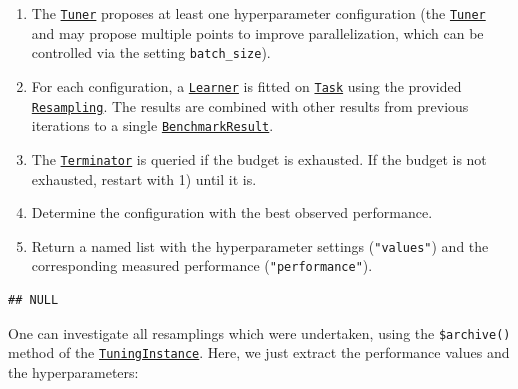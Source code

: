 \documentclass[]{scrbook}
\newenvironment{Shaded}{\begin{snugshade}}{\end{snugshade}}
\newcommand{\DataTypeTok}[1]{\textcolor[rgb]{0.13,0.29,0.53}{#1}}
\newcommand{\KeywordTok}[1]{\textcolor[rgb]{0.13,0.29,0.53}{\textbf{#1}}}
\newcommand{\NormalTok}[1]{#1}
\newcommand{\OperatorTok}[1]{\textcolor[rgb]{0.81,0.36,0.00}{\textbf{#1}}}
\newcommand{\StringTok}[1]{\textcolor[rgb]{0.31,0.60,0.02}{#1}}
\providecommand{\tightlist}{%
  \setlength{\itemsep}{0pt}\setlength{\parskip}{0pt}}
\renewenvironment{Shaded} {\begin{snugshade}\small} {\end{snugshade}}
\begin{document}
\begin{enumerate}
\def\labelenumi{\arabic{enumi}.}
\tightlist
\item
  The \href{https://mlr3tuning.mlr-org.com/reference/Tuner.html}{\texttt{Tuner}} proposes at least one hyperparameter configuration (the \href{https://mlr3tuning.mlr-org.com/reference/Tuner.html}{\texttt{Tuner}} and may propose multiple points to improve parallelization, which can be controlled via the setting \texttt{batch\_size}).
\item
  For each configuration, a \href{https://mlr3.mlr-org.com/reference/Learner.html}{\texttt{Learner}} is fitted on \href{https://mlr3.mlr-org.com/reference/Task.html}{\texttt{Task}} using the provided \href{https://mlr3.mlr-org.com/reference/Resampling.html}{\texttt{Resampling}}.
  The results are combined with other results from previous iterations to a single \href{https://mlr3.mlr-org.com/reference/BenchmarkResult.html}{\texttt{BenchmarkResult}}.
\item
  The \href{https://mlr3tuning.mlr-org.com/reference/Terminator.html}{\texttt{Terminator}} is queried if the budget is exhausted.
  If the budget is not exhausted, restart with 1) until it is.
\item
  Determine the configuration with the best observed performance.
\item
  Return a named list with the hyperparameter settings (\texttt{"values"}) and the corresponding measured performance (\texttt{"performance"}).
\end{enumerate}

\begin{Shaded}
\end{Shaded}

\begin{verbatim}
## NULL
\end{verbatim}

One can investigate all resamplings which were undertaken, using the \texttt{\$archive()} method of the \href{https://mlr3tuning.mlr-org.com/reference/TuningInstance.html}{\texttt{TuningInstance}}.
Here, we just extract the performance values and the hyperparameters:

\begin{Shaded}
\end{Shaded}
\end{document}
